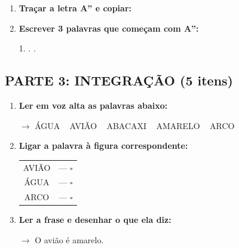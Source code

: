 \begin{exercicio}
\begin{enumerate}[resume]
  \item \textbf{Traçar a letra A'' e copiar:}
  \begin{center}
  \end{center}

  \item \textbf{Escrever 3 palavras que começam com A'':}
  \begin{center}
  1. \underline{\hspace{3cm}} . \underline{\hspace{3cm}} . \underline{\hspace{3cm}}
  \end{center}
\end{enumerate}

\subsection*{PARTE 3: INTEGRAÇÃO (5 itens)}

\begin{enumerate}[resume]
  \item \textbf{Ler em voz alta as palavras abaixo:}
  \begin{center}
  $\rightarrow$ ÁGUA  ~  AVIÃO  ~  ABACAXI  ~  AMARELO  ~  ARCO
  \end{center}

  \item \textbf{Ligar a palavra à figura correspondente:}
  \begin{center}
  \begin{tabular}{cc}
  AVIÃO & \quad --- \quad $\square$ \\
  ÁGUA & \quad --- \quad $\square$ \\
  ARCO & \quad --- \quad $\square$
  \end{tabular}
  \end{center}

  \item \textbf{Ler a frase e desenhar o que ela diz:}
  \begin{center}
  $\rightarrow$ O avião é amarelo.
  \end{center}
  \begin{center}
  \end{center}


\end{enumerate}
\end{exercicio}
